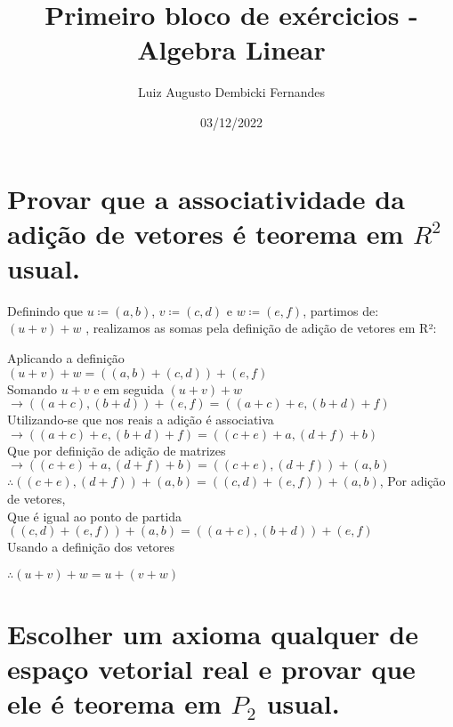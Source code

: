 \documentclass[12pt, twoside, a4]{article} %
\begin{document}
\title{Primeiro bloco de exércicios - Algebra Linear}
\author{Luiz Augusto Dembicki Fernandes}
\date{03/12/2022}
\maketitle

\section{Provar que a associatividade da adição de vetores é teorema em $ R^2 $ usual.}

\quad    Definindo que $ u \coloneqq (a, b)$, $v  \coloneqq  (c, d)$ e $w  \coloneqq  (e, f)$, partimos de:
$ (u + v) + w $ , realizamos as somas pela definição de adição de vetores em R²:
\begin{center}
    \begin{doublespacing}
            
        Aplicando a definição \\ 
        $ (u + v) + w = ((a, b) + (c, d)) + (e, f)$ \\
        Somando $u + v$ e em seguida $ (u + v) + w$ \\
        $ \to ((a + c), (b + d)) + (e, f) =  ((a + c) + e, (b + d) + f)$ \\
        Utilizando-se que nos reais a adição é associativa \\
        $ \to ((a + c) + e, (b + d) + f) = ((c + e) + a, (d + f) + b)$ \\
        Que por definição de adição de matrizes \\
        $ \to  ((c + e) + a, (d + f) + b) = ((c + e), (d + f)) + (a, b)$ \\
        $ \therefore ((c + e), (d + f)) + (a, b) = ((c, d) + (e, f)) + (a, b)$, Por adição de vetores, \\
        Que é igual ao ponto de partida \\
        $ ((c, d) + (e, f)) + (a, b) =  ((a + c), (b + d)) + (e, f)$ \\
        Usando a definição dos vetores \\
    \end{doublespacing}
    $ \therefore (u + v) + w = u + (v + w) $
\end{center}

\section{Escolher um axioma qualquer de espaço vetorial real e provar que ele é teorema em $P_2$ usual.}
\end{document}
